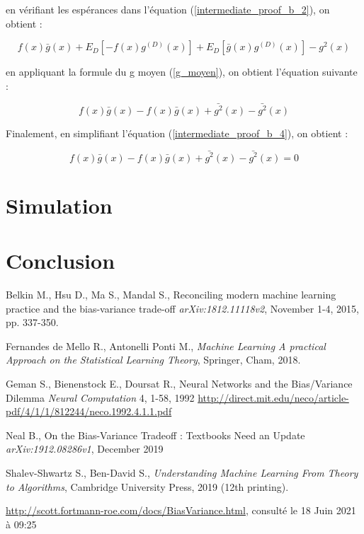 \documentclass[a4paper]{article}
\begin{document}
en vérifiant les espérances dans l'équation (\ref{intermediate_proof_b_2}), on obtient :

\begin{equation}
	\label{intermediate_proof_b_3}
	f(x)\bar{g}(x) + E_{D} [- f(x)g^{(D)}(x)] + E_{D} [ \bar{g}(x)g^{(D)}(x)] -g^2(x)
\end{equation}

en appliquant la formule du g moyen (\ref{g_moyen}), on obtient l'équation suivante :

\begin{equation}
	\label{intermediate_proof_b_4}
	f(x)\bar{g}(x) - f(x)\bar{g}(x) + \bar{g^2}(x) -\bar{g^2}(x)
\end{equation}

Finalement, en simplifiant l'équation (\ref{intermediate_proof_b_4}), on obtient :

\begin{equation}
	\label{intermediate_proof_b_5}
	f(x)\bar{g}(x) - f(x)\bar{g}(x) + \bar{g^2}(x) -\bar{g^2}(x) = 0
\end{equation}

\newpage

\section{Simulation}
 
\newpage

\section{Conclusion}

\newpage

\begin{thebibliography}{9}
	
	Belkin M., Hsu D., Ma S., Mandal S.,
	Reconciling modern machine learning practice and the bias-variance trade-off
	\textit{arXiv:1812.11118v2}, November 1-4, 2015, pp. 337-350.
	
	Fernandes de Mello R., Antonelli Ponti M.,
	\textit{Machine Learning A practical Approach on the Statistical Learning Theory},
	Springer, Cham, 2018.
	
	Geman S., Bienenstock E., Doursat R.,
	Neural Networks and the Bias/Variance Dilemma
	\textit{Neural Computation} 4, 1-58, 1992
	\url{http://direct.mit.edu/neco/article-pdf/4/1/1/812244/neco.1992.4.1.1.pdf}
	
	Neal B.,
	On the Bias-Variance Tradeoff : Textbooks Need an Update
	\textit{arXiv:1912.08286v1}, December 2019
	
	Shalev-Shwartz S., Ben-David S.,
	\textit{Understanding Machine Learning From Theory to Algorithms},
	Cambridge University Press, 2019 (12th printing).
	
	\url{http://scott.fortmann-roe.com/docs/BiasVariance.html},
	consulté le 18 Juin 2021 à 09:25
	
	
\end{thebibliography}
\newpage

\listoffigures
\newpage
\end{document}
